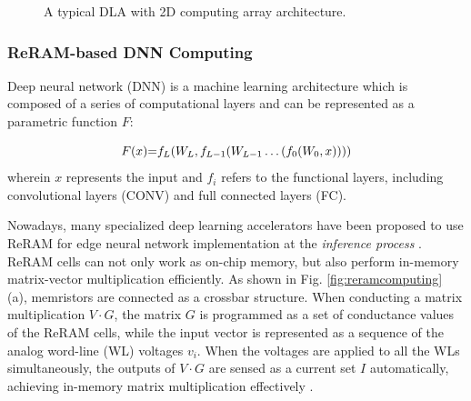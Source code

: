 \begin{figure}
    \setlength{\abovecaptionskip}{-1pt}
    \setlength{\belowcaptionskip}{0pt}
            \caption{A typical DLA with 2D computing array architecture.}
            \label{fig:accelerator}
            \vspace{-1em}
\end{figure}

\subsubsection{ ReRAM-based DNN Computing}

Deep neural network (DNN) is a  machine learning architecture which is composed of a series of computational layers and can be represented as a parametric function ${F}$:


\begin{equation} 
    F(x){\rm{ = }}{f_L}({W _L},{f_{L - 1}}({W _{L - 1}} \ldots ({f_0}({W _0},x))))
\end{equation} 
wherein ${x}$ represents the input and ${f_i}$ refers to the functional layers, including convolutional layers (CONV) and full connected layers (FC).

Nowadays, many specialized deep learning accelerators have been proposed to use ReRAM for edge neural network implementation at the \emph{inference process} \cite{7551380, 7920854}. ReRAM cells can not only work as on-chip memory, but also perform in-memory matrix-vector multiplication efficiently. As shown in Fig. \ref{fig:reramcomputing} (a), memristors are connected as a crossbar structure. When conducting a matrix multiplication $V \cdot G$,  the matrix $G$ is programmed as a set of  conductance values of the ReRAM cells, while the input vector is represented as a sequence of the analog word-line (WL) voltages $v_i$. When the voltages are applied to all the WLs simultaneously, the outputs of $V \cdot G$  are sensed as a current set $I$ automatically, achieving in-memory matrix multiplication effectively \cite{Liu:2019:FTN:3287624.3288743}. 

